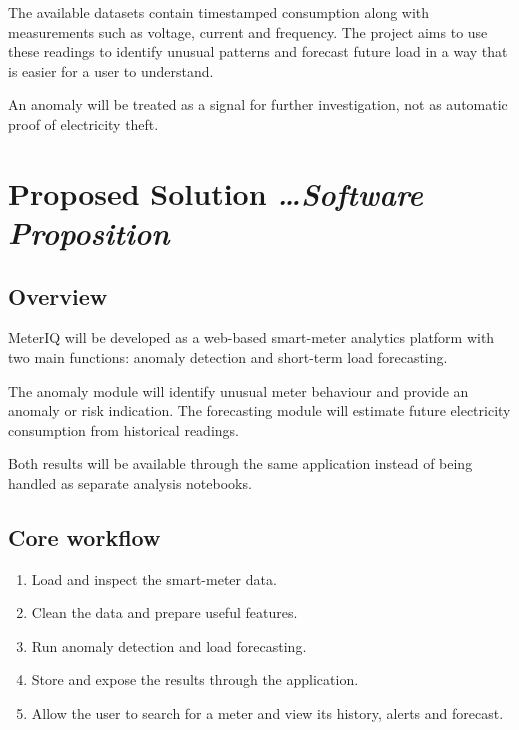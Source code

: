 \documentclass[11pt,a4paper]{article}
\newcommand{\BvrHint}[1]{%
  {\normalfont\normalsize\itshape\hfill #1}}
\begin{document}
The available datasets contain timestamped consumption along with
measurements such as voltage, current and frequency. The project
aims to use these readings to identify unusual patterns and forecast
future load in a way that is easier for a user to understand.

An anomaly will be treated as a signal for further investigation,
not as automatic proof of electricity theft.

\section{Proposed Solution %
  \BvrHint{\ldots Software Proposition}}

\subsection{Overview}

MeterIQ will be developed as a web-based smart-meter analytics
platform with two main functions: anomaly detection and short-term
load forecasting.

The anomaly module will identify unusual meter behaviour and provide
an anomaly or risk indication. The forecasting module will estimate
future electricity consumption from historical readings.

Both results will be available through the same application instead
of being handled as separate analysis notebooks.

\subsection{Core workflow}

\begin{enumerate}[leftmargin=0.7cm]

    \item Load and inspect the smart-meter data.

    \item Clean the data and prepare useful features.

    \item Run anomaly detection and load forecasting.

    \item Store and expose the results through the application.

    \item Allow the user to search for a meter and view its history,
    alerts and forecast.

\end{enumerate}
\end{document}
